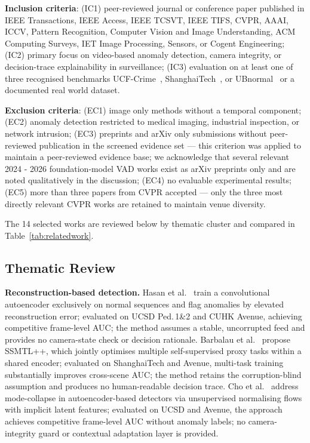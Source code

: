 \documentclass[a4paper,fleqn]{cas-dc}
\begin{document}
\noindent\textbf{Inclusion criteria}: (IC1) peer-reviewed journal or conference paper published in IEEE Transactions, IEEE Access, IEEE TCSVT, IEEE TIFS, CVPR, AAAI, ICCV, Pattern Recognition, Computer Vision and Image Understanding, ACM Computing Surveys, IET Image Processing, Sensors, or Cogent Engineering; (IC2) primary focus on video-based anomaly detection, camera integrity, or decision-trace explainability in surveillance; (IC3) evaluation on at least one of three recognised benchmarks UCF-Crime~\citep{sultani2018realworld}, ShanghaiTech~\citep{georgescu2021anomaly}, or UBnormal~\citep{acsintoae2022ubnormal} or a documented real world dataset.
 
\noindent\textbf{Exclusion criteria}: (EC1) image only methods without a temporal component; (EC2) anomaly detection restricted to medical imaging, industrial inspection, or network intrusion; (EC3) preprints and arXiv only submissions without peer-reviewed publication in the screened evidence set — this criterion was applied to maintain a peer-reviewed evidence base; we acknowledge that several relevant 2024 - 2026 foundation-model VAD works exist as arXiv preprints only and are noted qualitatively in the discussion; (EC4) no evaluable experimental results; (EC5) more than three papers from CVPR accepted — only the three most directly relevant CVPR works are retained to maintain venue diversity.
 
The 14 selected works are reviewed below by thematic cluster and compared in Table~\ref{tab:relatedwork}.
 
\FloatBarrier
\subsection{Thematic Review}
 
\textbf{Reconstruction-based detection.}
Hasan et al.~\citep{hasan2016anomaly} train a convolutional autoencoder exclusively on normal sequences and flag anomalies by elevated reconstruction error; evaluated on UCSD Ped.\,1\&2 and CUHK Avenue, achieving competitive frame-level AUC; the method assumes a stable, uncorrupted feed and provides no camera-state check or decision rationale.
Barbalau et al.~\citep{barbalau2023ssmtl} propose SSMTL++, which jointly optimises multiple self-supervised proxy tasks within a shared encoder; evaluated on ShanghaiTech and Avenue, multi-task training substantially improves cross-scene AUC; the method retains the corruption-blind assumption and produces no human-readable decision trace.
Cho et al.~\citep{cho2023lookonce} address mode-collapse in autoencoder-based detectors via unsupervised normalising flows with implicit latent features; evaluated on UCSD and Avenue, the approach achieves competitive frame-level AUC without anomaly labels; no camera-integrity guard or contextual adaptation layer is provided.
 
\end{document}
